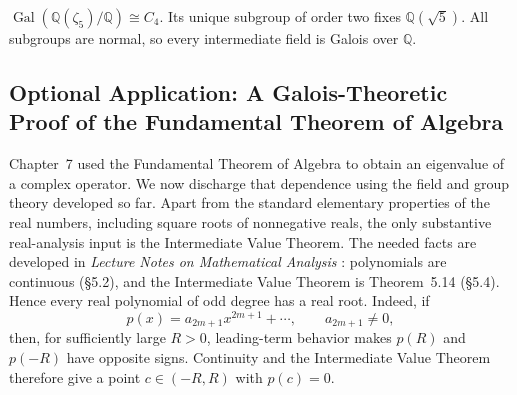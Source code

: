 \begin{example}
\(\operatorname{Gal}(\mathbb Q(\zeta_5)/\mathbb Q)\cong C_4\).  Its unique
subgroup of order two fixes \(\mathbb Q(\sqrt5)\).  All subgroups are normal,
so every intermediate field is Galois over \(\mathbb Q\).
\end{example}

\subsection*{Optional Application: A Galois-Theoretic Proof of the Fundamental Theorem of Algebra}

Chapter~7 used the Fundamental Theorem of Algebra to obtain an eigenvalue of a
complex operator.  We now discharge that dependence using the field and group
theory developed so far.  Apart from the standard elementary properties of
the real numbers, including square roots of nonnegative reals, the only
substantive real-analysis input is the Intermediate Value Theorem.  The
needed facts are developed in \emph{Lecture Notes on Mathematical Analysis}
\cite{MA}: polynomials are continuous (\S5.2), and the Intermediate Value
Theorem is Theorem~5.14 (\S5.4).  Hence every real polynomial of odd degree
has a real root.  Indeed, if
\[
p(x)=a_{2m+1}x^{2m+1}+\cdots,
\qquad
a_{2m+1}\ne0,
\]
then, for sufficiently large \(R>0\), leading-term behavior makes \(p(R)\)
and \(p(-R)\) have opposite signs.  Continuity and the Intermediate Value
Theorem therefore give a point \(c\in(-R,R)\) with \(p(c)=0\).

